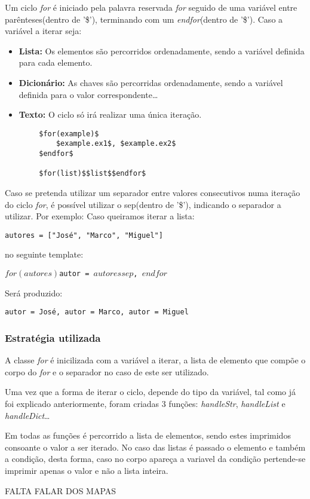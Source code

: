\documentclass[../relatorio.tex]{subfiles}
\begin{document}
    Um ciclo \textit{for} é iniciado pela palavra reservada \textit{for}
    seguido de uma variável entre parênteses(dentro de '\$'), terminando 
    com um \textit{endfor}(dentro de '\$').
    Caso a variável a iterar seja:
    \begin{itemize}
        \item \textbf{Lista: }Os elementos são percorridos ordenadamente,
        sendo a variável definida para cada elemento.
        \item \textbf{Dicionário: }As chaves são percorridas ordenadamente,
        sendo a variável definida para o valor correspondente\dots
        \item \textbf{Texto: }O ciclo só irá realizar uma única iteração.
    \end{itemize}

    \begin{verbatim}
        $for(example)$
            $example.ex1$, $example.ex2$
        $endfor$

        $for(list)$$list$$endfor$
    \end{verbatim}

    Caso se pretenda utilizar um separador entre valores consecutivos numa
    iteração do ciclo \textit{for}, é possível utilizar o sep(dentro de '\$'),
    indicando o separador a utilizar. Por exemplo:
    Caso queiramos iterar a lista:

    \texttt{autores = ["José", "Marco", "Miguel"]}

    no seguinte template:

    \texttt{$for(autores)$autor = $autores$$sep$, $endfor$}

    Será produzido:

    \texttt{autor = José, autor = Marco, autor = Miguel}

    \subsubsection{Estratégia utilizada}

    A classe \textit{for} é inicilizada com a variável a iterar, a lista
    de elemento que compõe o corpo do \textit{for} e o separador no caso de
    este ser utilizado.

    Uma vez que a forma de iterar o ciclo, depende do tipo da variável, tal como
    já foi explicado anteriormente, foram criadas 3 funções: \textit{handleStr},
    \textit{handleList} e \textit{handleDict}\dots

    Em todas as funções é percorrido a lista de elementos, sendo estes imprimidos
    consoante o valor a ser iterado. No caso das listas é passado o elemento e também
    a condição, desta forma, caso no corpo apareça a variavel da condição pertende-se 
    imprimir apenas o valor e não a lista inteira. 
    
    FALTA FALAR DOS MAPAS
\end{document}
